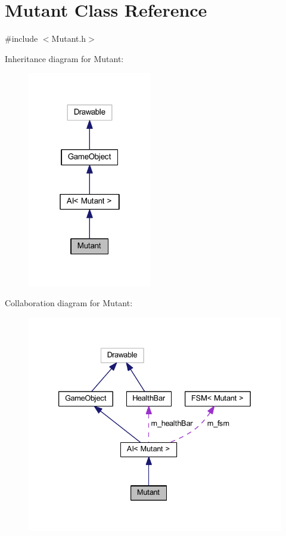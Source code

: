 \hypertarget{class_mutant}{}\section{Mutant Class Reference}
\label{class_mutant}


{\ttfamily \#include $<$Mutant.\+h$>$}



Inheritance diagram for Mutant\+:\nopagebreak
\begin{figure}[H]
\begin{center}
\leavevmode
\includegraphics[width=154pt]{class_mutant__inherit__graph}
\end{center}
\end{figure}


Collaboration diagram for Mutant\+:\nopagebreak
\begin{figure}[H]
\begin{center}
\leavevmode
\includegraphics[width=333pt]{class_mutant__coll__graph}
\end{center}
\end{figure}
